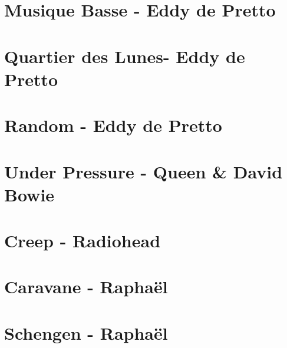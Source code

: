 \documentclass[11pt]{article}
\begin{document}
\section{Musique Basse - Eddy de Pretto}
\begin{guitar}

\end{guitar}

\section{Quartier des Lunes- Eddy de Pretto}
\begin{guitar}

\end{guitar}

\section{Random - Eddy de Pretto}
\begin{guitar}

\end{guitar}

\section{Under Pressure - Queen \& David Bowie}
\begin{guitar}

\end{guitar}

\section{Creep - Radiohead}
\begin{guitar}

\end{guitar}

\section{Caravane - Raphaël}
\begin{guitar}

\end{guitar}

\section{Schengen - Raphaël}
\begin{guitar}

\end{guitar}
\end{document}
